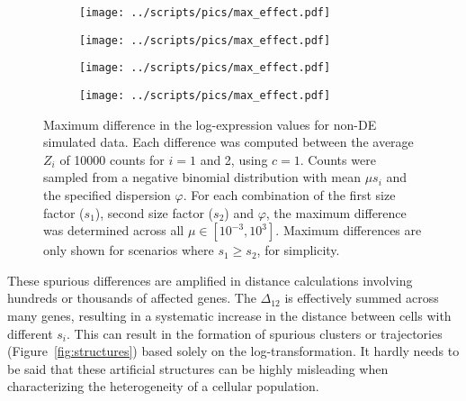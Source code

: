 \documentclass[10pt,letterpaper]{article}
\begin{document}
\begin{figure}[btp]
\centering
\begin{subfigure}[b]{0.49\textwidth}
    \texttt{[image: ../scripts/pics/max\_effect.pdf]}
    \caption{}
\end{subfigure}
\begin{subfigure}[b]{0.49\textwidth}
    \texttt{[image: ../scripts/pics/max\_effect.pdf]}
    \caption{}
\end{subfigure}
\begin{subfigure}[b]{0.49\textwidth}
    \texttt{[image: ../scripts/pics/max\_effect.pdf]}
    \caption{}
\end{subfigure}
\begin{subfigure}[b]{0.49\textwidth}
    \texttt{[image: ../scripts/pics/max\_effect.pdf]}
    \caption{}
\end{subfigure}
\caption{Maximum difference in the log-expression values for non-DE simulated data.
Each difference was computed between the average $Z_i$ of 10000 counts for $i=1$ and 2, using $c=1$.
Counts were sampled from a negative binomial distribution with mean $\mu s_i$ and the specified dispersion $\varphi$.
For each combination of the first size factor ($s_1$), second size factor ($s_2$) and $\varphi$, the maximum difference was determined across all $\mu \in [10^{-3}, 10^3]$.
Maximum differences are only shown for scenarios where $s_1 \ge s_2$, for simplicity.
}
\label{fig:maxeffect}
\end{figure}

These spurious differences are amplified in distance calculations involving hundreds or thousands of affected genes.
The $\Delta_{12}$ is effectively summed across many genes, resulting in a systematic increase in the distance between cells with different $s_i$. 
This can result in the formation of spurious clusters or trajectories (Figure~\ref{fig:structures}) based solely on the log-transformation.
It hardly needs to be said that these artificial structures can be highly misleading when characterizing the heterogeneity of a cellular population.
\end{document}
